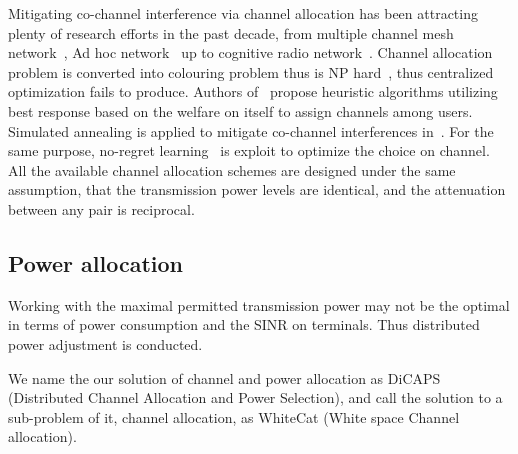 Mitigating co-channel interference via channel allocation has been attracting plenty of research efforts in the past decade, from multiple channel mesh network~\cite{Hyacinth}, Ad hoc network~\cite{Ko_DistributedCA} up to cognitive radio network~\cite{SA_CA_TVWS_2012crowncom,qlearning_huang}. 
Channel allocation problem is converted into colouring problem thus is NP hard~\cite{Hyacinth}, thus centralized optimization fails to produce.
Authors of~\cite{Ko_DistributedCA} propose heuristic algorithms utilizing best response based on the welfare on itself to assign channels among users.
Simulated annealing is applied to mitigate co-channel interferences in~\cite{SA_CA_TVWS_2012crowncom}.
For the same purpose, no-regret learning~\cite{qlearning_huang, hart00correlatedeq} is exploit to optimize the choice on channel.
All the available channel allocation schemes are designed under the same assumption, that the transmission power levels are identical, and the attenuation between any pair is reciprocal.
\subsection{Power allocation}
\label{PA}
Working with the maximal permitted transmission power may not be the optimal in terms of power consumption and the SINR on terminals.
Thus distributed power adjustment is conducted.

We name the our solution of channel and power allocation as \gls{DiCAPS} (Distributed Channel Allocation and Power Selection), and call the solution to a sub-problem of it, \ie channel allocation, as \gls{WhiteCat} (White space Channel allocation).



%
%




